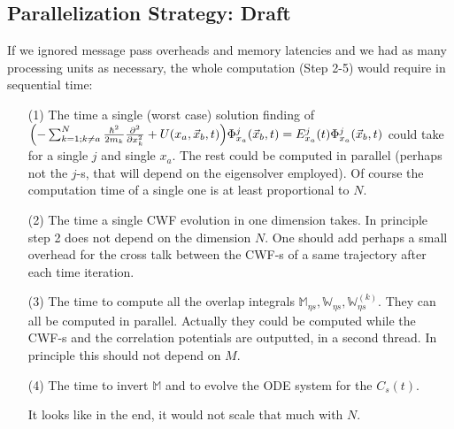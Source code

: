 \documentclass[11pt, a4paper]{article} %
\begin{document}
\subsection{Parallelization Strategy: Draft}
If we ignored message pass overheads and memory latencies and we had as many processing units as necessary, the whole computation (Step 2-5) would require in sequential time:
\begin{enumerate}
\item[(1)] The time a single (worst case) solution finding of $\qty(- \sum_{k=1; k\neq a}^{N} \frac{\hbar^2}{2m_k}\pdv[2]{}{x_k}+U(x_a,\vec{x}_b,t) )\Phi_{x_a}^j(\vec{x}_b,t) = E_{x_a}^j(t)\Phi_{x_a}^j(\vec{x}_b,t)$ could take for a single $j$ and single $x_a$. The rest could be computed in parallel (perhaps not the $j$-s, that will depend on the eigensolver employed). Of course the computation time of a single one is at least proportional to $N$.

\item[(2)] The time a single CWF evolution in one dimension takes. In principle step 2 does not depend on the dimension $N$. One should add perhaps a small overhead for the cross talk between the CWF-s of a same trajectory after each time iteration.
\item[(3)] The time to compute all the overlap integrals $\mathbb{M}_{\eta s}, \mathbb{W}_{\eta s}, \mathbb{W}^{(k)}_{\eta s}$. They can all be computed in parallel. Actually they could be computed while the CWF-s and the correlation potentials are outputted, in a second thread. In principle this should not depend on $M$.

\item[(4)] The time to invert $\mathbb{M}$ and to evolve the ODE system for the $C_s(t)$.

\vspace{+0.3cm}
It looks like in the end, it would not scale that much with $N$.



\end{enumerate}

\clearpage
\null
\newpage
\clearpage
\end{document}

